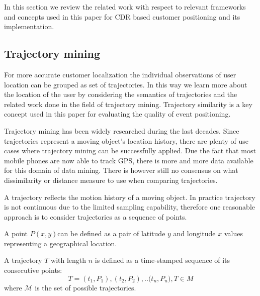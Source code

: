 In this section we review the related work with respect to relevant frameworks and concepts used in this paper for CDR based customer positioning and its implementation.

\subsection{Trajectory mining}
For more accurate customer localization the individual observations of user location can be grouped as set of trajectories. In this way we learn more about the location of the user by considering the semantics of trajectories and the related work done in the field of trajectory mining. Trajectory similarity is a key concept used in this paper for evaluating the quality of event positioning.

Trajectory mining has been widely researched during the last decades. Since trajectories represent a moving object's location history, there are plenty of use cases where trajectory mining can be successfully applied.  Due the fact that most mobile phones are now able to track GPS, there is more and more data available for this domain of data mining. There is however still no consensus on what dissimilarity or distance measure to use when comparing trajectories.

A trajectory reflects the motion history of a moving object. In practice trajectory is not continuous due to the limited sampling capability, therefore one reasonable approach is to consider trajectories as a sequence of points.

\begin{definition}
A point $P(x,y)$can be defined as a pair of latitude $y$ and longitude $x$ values representing a geographical location.
\end{definition}

\begin{definition}
A trajectory $T$ with length $n$ is defined as a time-stamped sequence of its consecutive points: \[T={(t_{1},P_{1}), (t_{2},P_{2}), .. (t_{n},P_{n}}), T \in M\]
where $\mathcal{M}$ is the set of possible trajectories.
\end{definition}

